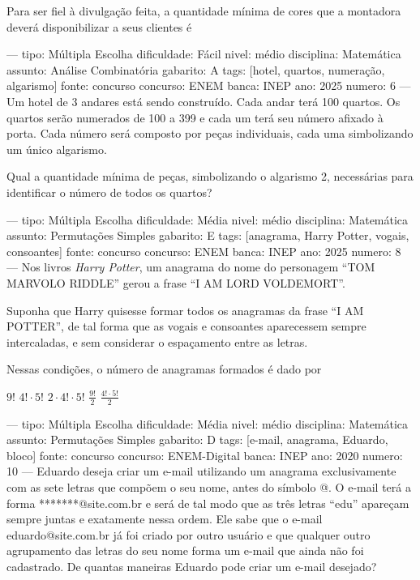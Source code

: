 Para ser fiel à divulgação feita, a quantidade mínima de cores que a montadora deverá disponibilizar a seus clientes é
\begin{oneparchoices}
\end{oneparchoices}

---
tipo: Múltipla Escolha
dificuldade: Fácil
nivel: médio
disciplina: Matemática
assunto: Análise Combinatória
gabarito: A
tags: [hotel, quartos, numeração, algarismo]
fonte: concurso
concurso: ENEM
banca: INEP
ano: 2025
numero: 6
---
\question
Um hotel de 3 andares está sendo construído. Cada andar terá 100 quartos. Os quartos serão numerados de 100 a 399 e cada um terá seu número afixado à porta. Cada número será composto por peças individuais, cada uma simbolizando um único algarismo.

Qual a quantidade mínima de peças, simbolizando o algarismo 2, necessárias para identificar o número de todos os quartos?
\begin{oneparchoices}
\end{oneparchoices}

---
tipo: Múltipla Escolha
dificuldade: Média
nivel: médio
disciplina: Matemática
assunto: Permutações Simples
gabarito: E
tags: [anagrama, Harry Potter, vogais, consoantes]
fonte: concurso
concurso: ENEM
banca: INEP
ano: 2025
numero: 8
---
\question
Nos livros \textit{Harry Potter}, um anagrama do nome do personagem “TOM MARVOLO RIDDLE” gerou a frase “I AM LORD VOLDEMORT”.

Suponha que Harry quisesse formar todos os anagramas da frase “I AM POTTER”, de tal forma que as vogais e consoantes aparecessem sempre intercaladas, e sem considerar o espaçamento entre as letras.

Nessas condições, o número de anagramas formados é dado por
\begin{oneparchoices}
\choice \( 9! \)
\choice \( 4! \cdot 5! \)
\choice \( 2 \cdot 4! \cdot 5! \)
\choice \( \frac{9!}{2} \)
\correctchoice \( \frac{4! \cdot 5!}{2} \)
\end{oneparchoices}

---
tipo: Múltipla Escolha
dificuldade: Média
nivel: médio
disciplina: Matemática
assunto: Permutações Simples
gabarito: D
tags: [e-mail, anagrama, Eduardo, bloco]
fonte: concurso
concurso: ENEM-Digital
banca: INEP
ano: 2020
numero: 10
---
\question
Eduardo deseja criar um e-mail utilizando um anagrama exclusivamente com as sete letras que compõem o seu nome, antes do símbolo @. O e-mail terá a forma *******@site.com.br e será de tal modo que as três letras “edu” apareçam sempre juntas e exatamente nessa ordem. Ele sabe que o e-mail eduardo@site.com.br já foi criado por outro usuário e que qualquer outro agrupamento das letras do seu nome forma um e-mail que ainda não foi cadastrado. De quantas maneiras Eduardo pode criar um e-mail desejado?
\begin{oneparchoices}
\end{oneparchoices}

